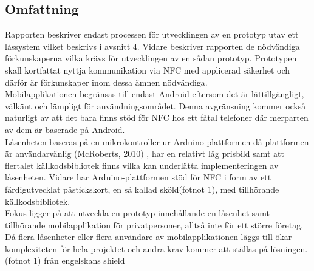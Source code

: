 \documentclass[11pt]{article}
\begin{document}
\subsection{Omfattning}
Rapporten beskriver endast processen för utvecklingen av en prototyp utav ett låssystem vilket beskrivs i avsnitt 4. Vidare beskriver rapporten de nödvändiga förkunskaperna vilka krävs för utvecklingen av en sådan prototyp. Prototypen skall kortfattat nyttja kommunikation via NFC med applicerad säkerhet och därför är förkunskaper inom dessa ämnen nödvändiga.\\
Mobilapplikationen begränsas till endast Android eftersom det är lättillgängligt, välkänt och lämpligt för användningsområdet. Denna avgränsning kommer också naturligt av att det bara finns stöd för NFC hos ett fåtal telefoner där merparten av dem är baserade på Android.\\
Låsenheten baseras på en mikrokontroller ur Arduino-plattformen då plattformen är användarvänlig (McRoberts, 2010) , har en relativt låg prisbild samt att flertalet källkodsbibliotek finns vilka kan underlätta implementeringen av låsenheten. Vidare har Arduino-plattformen stöd för NFC i form av ett färdigutvecklat påstickskort, en så kallad sköld(fotnot 1), med tillhörande källkodsbibliotek.\\
Fokus ligger på att utveckla en prototyp innehållande en låsenhet samt tillhörande mobilapplikation för privatpersoner, alltså inte för ett större företag. Då flera låsenheter eller flera användare av mobilapplikationen läggs till ökar komplexiteten för hela projektet och andra krav kommer att ställas på lösningen.\\
(fotnot 1) från engelskans shield
\end{document}
